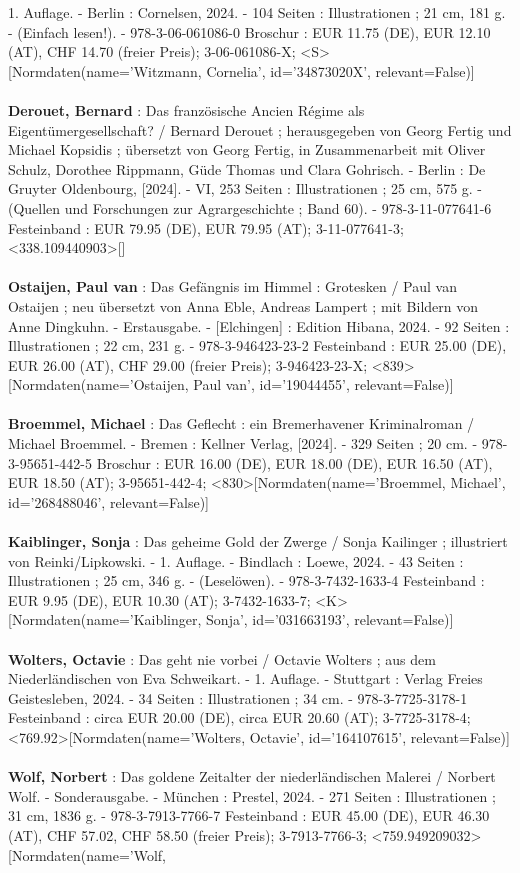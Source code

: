 \documentclass{article}
\begin{document}
\begin{multicols}{3}
1. Auflage. - Berlin : Cornelsen, 2024. - 104 Seiten : Illustrationen ; 21 cm, 181 g. - (Einfach lesen!). - 978-3-06-061086-0 Broschur : EUR 11.75 (DE), EUR 12.10 (AT), CHF 14.70 (freier Preis); 3-06-061086-X; <S>[Normdaten(name='Witzmann, Cornelia', id='34873020X', relevant=False)]\\\\\textbf{Derouet, Bernard} : Das französische Ancien Régime als Eigentümergesellschaft? / Bernard Derouet ; herausgegeben von Georg Fertig und Michael Kopsidis ; übersetzt von Georg Fertig, in Zusammenarbeit mit Oliver Schulz, Dorothee Rippmann, Güde Thomas und Clara Gohrisch. - Berlin : De Gruyter Oldenbourg, [2024]. - VI, 253 Seiten : Illustrationen ; 25 cm, 575 g. - (Quellen und Forschungen zur Agrargeschichte ; Band 60). - 978-3-11-077641-6 Festeinband : EUR 79.95 (DE), EUR 79.95 (AT); 3-11-077641-3; <338.109440903>[]\\\\\textbf{Ostaijen, Paul van} : Das Gefängnis im Himmel : Grotesken / Paul van Ostaijen ; neu übersetzt von Anna Eble, Andreas Lampert ; mit Bildern von Anne Dingkuhn. - Erstausgabe. - [Elchingen] : Edition Hibana, 2024. - 92 Seiten : Illustrationen ; 22 cm, 231 g. - 978-3-946423-23-2 Festeinband : EUR 25.00 (DE), EUR 26.00 (AT), CHF 29.00 (freier Preis); 3-946423-23-X; <839>[Normdaten(name='Ostaijen, Paul van', id='19044455', relevant=False)]\\\\\textbf{Broemmel, Michael} : Das Geflecht : ein Bremerhavener Kriminalroman / Michael Broemmel. - Bremen : Kellner Verlag, [2024]. - 329 Seiten ; 20 cm. - 978-3-95651-442-5 Broschur : EUR 16.00 (DE), EUR 18.00 (DE), EUR 16.50 (AT), EUR 18.50 (AT); 3-95651-442-4; <830>[Normdaten(name='Broemmel, Michael', id='268488046', relevant=False)]\\\\\textbf{Kaiblinger, Sonja} : Das geheime Gold der Zwerge / Sonja Kailinger ; illustriert von  Reinki/Lipkowski. - 1. Auflage. - Bindlach : Loewe, 2024. - 43 Seiten : Illustrationen ; 25 cm, 346 g. - (Leselöwen). - 978-3-7432-1633-4 Festeinband : EUR 9.95 (DE), EUR 10.30 (AT); 3-7432-1633-7; <K>[Normdaten(name='Kaiblinger, Sonja', id='031663193', relevant=False)]\\\\\textbf{Wolters, Octavie} : Das geht nie vorbei / Octavie Wolters ; aus dem Niederländischen von Eva Schweikart. - 1. Auflage. - Stuttgart : Verlag Freies Geistesleben, 2024. - 34 Seiten : Illustrationen ; 34 cm. - 978-3-7725-3178-1 Festeinband : circa EUR 20.00 (DE), circa EUR 20.60 (AT); 3-7725-3178-4; <769.92>[Normdaten(name='Wolters, Octavie', id='164107615', relevant=False)]\\\\\textbf{Wolf, Norbert} : Das goldene Zeitalter der niederländischen Malerei / Norbert Wolf. - Sonderausgabe. - München : Prestel, 2024. - 271 Seiten : Illustrationen ; 31 cm, 1836 g. - 978-3-7913-7766-7 Festeinband : EUR 45.00 (DE), EUR 46.30 (AT), CHF 57.02, CHF 58.50 (freier Preis); 3-7913-7766-3; <759.949209032>[Normdaten(name='Wolf, 
\end{multicols}
\end{document}
